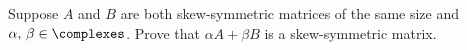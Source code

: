 Suppose $A$ and $B$ are both skew-symmetric matrices of the same size and $\alpha,\,\beta\in\complexes$.  Prove that $\alpha A + \beta B$ is a skew-symmetric matrix.